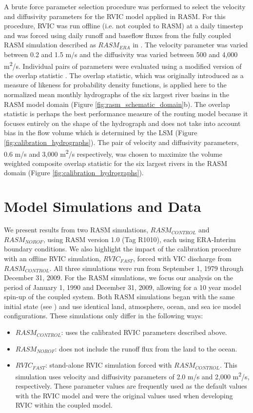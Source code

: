 \documentclass[jgrga, draft]{agutex}
\begin{document}
\begin{article}
A brute force parameter selection procedure was performed to select the velocity and diffusivity parameters for the RVIC model applied in RASM.
For this procedure, RVIC was run offline (i.e. not coupled to RASM) at a daily timestep and was forced using daily runoff and baseflow fluxes from the fully coupled RASM simulation described as $RASM_{ERA}$ in \citep{Hamman_2016}.
The velocity parameter was varied between 0.2 and 1.5 m/s and the diffusivity was varied between 500 and 4,000 m\textsuperscript{2}/s.
Individual pairs of parameters were evaluated using a modified version of the overlap statistic \citep{Perkins_2012}.
The overlap statistic, which was originally introduced as a measure of likeness for probability density functions, is applied here to the normalized mean monthly hydrographs of the six largest river basins in the RASM model domain (Figure \ref{fig:rasm_schematic_domain}b).
The overlap statistic is perhaps the best performance measure of the routing model because it focuses entirely on the shape of the hydrograph and does not take into account bias in the flow volume which is determined by the LSM (Figure \ref{fig:calibration_hydrographs}).
The pair of velocity and diffusivity parameters, 0.6 m/s and 3,000 m\textsuperscript{2}/s respectively, was chosen to maximize the volume weighted composite overlap statistic for the six largest rivers in the RASM domain (Figure \ref{fig:calibration_hydrographs}).

\section{Model Simulations and Data}
\label{sec:data}

We present results from two RASM simulations, $RASM_{CONTROL}$ and $RASM_{NOROF}$, using RASM version 1.0 (Tag R1010), each using ERA-Interim boundary conditions.
We also highlight the impact of the calibration procedure with an offline RVIC simulation, $RVIC_{FAST}$, forced with VIC discharge from $RASM_{CONTROL}$.
All three simulations were run from September 1, 1979 through December 31, 2009.
For the RASM simulations, we focus our analysis on the period of January 1, 1990 and December 31, 2009, allowing for a 10 year model spin-up of the coupled system.
Both RASM simulations began with the same initial state (see \citet{Hamman_2016}) and use identical land, atmosphere, ocean, and sea ice model configurations.
These simulations only differ in the following ways:
\begin{itemize}
     \item $RASM_{CONTROL}$: uses the calibrated RVIC parameters described above.
     \item $RASM_{NOROF}$: does not include the runoff flux from the land to the ocean.
     \item $RVIC_{FAST}$: stand-alone RVIC simulation forced with $RASM_{CONTROL}$.
          This simulation uses velocity and diffusivity parameters of 2.0 m/s and 2,000 m\textsuperscript{2}/s, respectively.
          These parameter values are frequently used as the default values with the RVIC model and were the original values used when developing RVIC within the coupled model.
\end{itemize}


\end{article}
\end{document}
